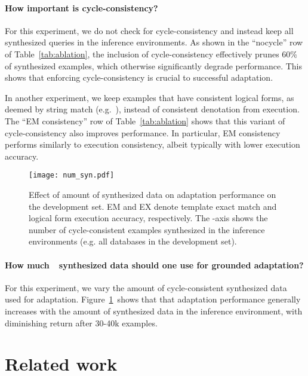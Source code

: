 \documentclass[11pt,a4paper]{article}
\begin{document}
\paragraph{How important is cycle-consistency?}
For this experiment, we do not check for cycle-consistency and instead keep all synthesized queries in the inference environments.
As shown in the ``nocycle'' row of Table~\ref{tab:ablation}, the inclusion of cycle-consistency effectively prunes 60\% of synthesized examples, which otherwise significantly degrade performance.
This shows that enforcing cycle-consistency is crucial to successful adaptation.

In another experiment, we keep examples that have consistent logical forms, as deemed by string match (e.g.~), instead of consistent denotation from execution.
The ``EM consistency'' row of Table~\ref{tab:ablation} shows that this variant of cycle-consistency also improves performance.
In particular, EM consistency performs similarly to execution consistency, albeit typically with lower execution accuracy.

\begin{figure}[t]
    \centering
    \texttt{[image: num\_syn.pdf]}
    \vspace{-0.2in}
    \caption{
    Effect of amount of synthesized data on adaptation performance on the development set.
    EM and EX denote template exact match and logical form execution accuracy, respectively.
    The -axis shows the number of cycle-consistent examples synthesized in the inference environments (e.g. all databases in the development set).
    }
    \vspace{-0.2in}
    \label{fig:adapt_curve}
\end{figure}


\paragraph{How much~\modelnameshort~synthesized data should one use for grounded adaptation?}
For this experiment, we vary the amount of cycle-consistent synthesized data used for adaptation.
Figure~\ref{fig:adapt_curve}~shows that that adaptation performance generally increases with the amount of synthesized data in the inference environment, with diminishing return after 30-40k examples.



\section{Related work}
\end{document}

